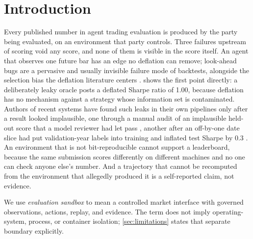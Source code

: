 \section{Introduction}\label{sec:intro}

Every published number in agent trading evaluation is produced by the party being evaluated, on an environment that party controls. Three failures upstream of scoring void any score, and none of them is visible in the score itself. An agent that observes one future bar has an edge no deflation can remove; look-ahead bugs are a pervasive and usually invisible failure mode of backtests, alongside the selection bias the deflation literature centers \citep{bailey2014deflated}.  shows the first point directly: a deliberately leaky oracle posts a deflated Sharpe ratio of 1.00, because deflation has no mechanism against a strategy whose information set is contaminated. Authors of recent systems have found such leaks in their own pipelines only after a result looked implausible, one through a manual audit of an implausible held-out score that a model reviewer had let pass \citep[pp.~21--22]{guo2026aqua}, another after an off-by-one date slice had put validation-year labels into training and inflated test Sharpe by 0.3 \citep[p.~11]{du2026mlfactor}. An environment that is not bit-reproducible cannot support a leaderboard, because the same submission scores differently on different machines and no one can check anyone else's number. And a trajectory that cannot be recomputed from the environment that allegedly produced it is a self-reported claim, not evidence.

We use \emph{evaluation sandbox} to mean a controlled market interface with governed observations, actions, replay, and evidence. The term does not imply operating-system, process, or container isolation; \cref{sec:limitations} states that separate boundary explicitly.

